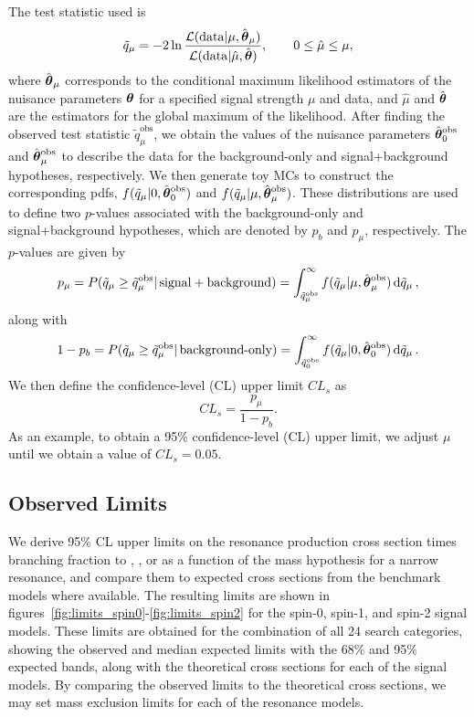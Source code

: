 The test statistic used is
\begin{equation}
  \tilde{q}_\mu=-2\ln\frac{\mathcal{L}(\mathrm{data}|\mu,\hat{\vb*{\theta}}_\mu)}{\mathcal{L}(\mathrm{data}|\hat{\mu},\hat{\vb*{\theta}})},\qquad 0\leq\hat{\mu}\leq\mu,
\end{equation}
where $\hat{\vb*{\theta}}_\mu$ corresponds to the conditional maximum likelihood estimators of the nuisance parameters $\vb*{\theta}$ for a specified signal strength $\mu$ and data, and $\hat{\mu}$ and $\hat{\vb*{\theta}}$ are the estimators for the global maximum of the likelihood.
After finding the observed test statistic $\tilde{q}_\mu^\mathrm{obs}$, we obtain the values of the nuisance parameters $\hat{\vb*{\theta}}_0^\mathrm{obs}$ and $\hat{\vb*{\theta}}_\mu^\mathrm{obs}$ to describe the data for the background-only and signal+background hypotheses, respectively.
We then generate toy MCs to construct the corresponding pdfs, $f(\tilde{q}_\mu|0,\hat{\vb*{\theta}}_0^\mathrm{obs})$ and $f(\tilde{q}_\mu|\mu,\hat{\vb*{\theta}}_\mu^\mathrm{obs})$.
These distributions are used to define two $p$-values associated with the background-only and signal+background hypotheses, which are denoted by $p_b$ and $p_\mu$, respectively.
The $p$-values are given by
\begin{equation}
  p_\mu=P(\tilde{q}_\mu\geq\tilde{q}_\mu^\mathrm{obs}|\operatorname{signal+background})=\int_{\tilde{q}_\mu^\mathrm{obs}}^\infty f(\tilde{q}_\mu|\mu,\hat{\vb*{\theta}}_\mu^\mathrm{obs})\dd{\tilde{q}_\mu},
\end{equation}
along with
\begin{equation}
  1-p_b=P(\tilde{q}_\mu\geq\tilde{q}_\mu^\mathrm{obs}|\operatorname{background-only})=\int_{\tilde{q}_0^\mathrm{obs}}^\infty f(\tilde{q}_\mu|0,\hat{\vb*{\theta}}_0^\mathrm{obs})\dd{\tilde{q}_\mu}.
\end{equation}
We then define the confidence-level (CL) upper limit $CL_s$ as
\begin{equation}
  CL_s=\frac{p_\mu}{1-p_b}.
\end{equation}
As an example, to obtain a 95\% confidence-level (CL) upper limit, we adjust $\mu$ until we obtain a value of $CL_s=0.05$.

\subsection{Observed Limits}

We derive 95\% CL upper limits on the resonance production cross section times branching fraction to \WW, \WZ, or \WH as a function of the mass hypothesis \MX for a narrow resonance, and compare them to expected cross sections from the benchmark models where available.
The resulting limits are shown in figures~\ref{fig:limits_spin0}-\ref{fig:limits_spin2} for the spin-0, spin-1, and spin-2 signal models.
These limits are obtained for the combination of all 24 search categories, showing the observed and median expected limits with the 68\% and 95\% expected bands, along with the theoretical cross sections for each of the signal models.
By comparing the observed limits to the theoretical cross sections, we may set mass exclusion limits for each of the resonance models.

